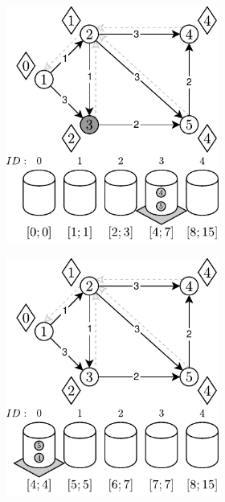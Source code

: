 \begin{figure}[!ht]
\begin{subfigure}[b]{\textwidth}
\begin{subfigure}[b]{0.32\textwidth}
			\includegraphics[width=\textwidth]{Chapter_II/RADIX-HEAP-NC-Example/d.pdf}
			\caption{}
			\label{fig:exampleRadixHeapNC:d}
		\end{subfigure}
		\hfill
		\begin{subfigure}[b]{0.32\textwidth}
			\includegraphics[width=\textwidth]{Chapter_II/RADIX-HEAP-NC-Example/e.pdf}

\end{subfigure}
\end{subfigure}
\end{figure}
